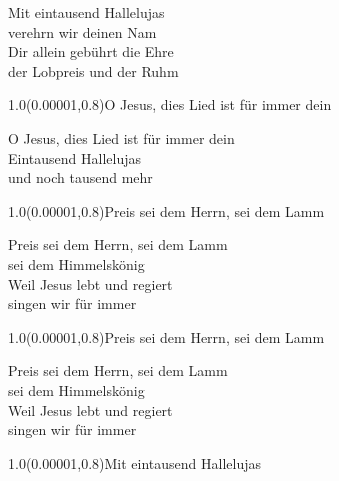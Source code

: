 \documentclass[aspectratio=169]{beamer}
\begin{document}
\begin{frame}
\centering
\color{white}
\huge{Mit eintausend Hallelujas} \\
\huge{verehrn wir deinen Nam} \\
\huge{Dir allein gebührt die Ehre} \\
\huge{der Lobpreis und der Ruhm} \\

\begin{textblock}{1.0}(0.00001,0.8)\color{gray}\normalsize{O Jesus, dies Lied ist für immer dein}\end{textblock}
\end{frame}

\begin{frame}
\centering
\color{white}
\huge{O Jesus, dies Lied ist für immer dein} \\
\huge{Eintausend Hallelujas} \\
\huge{und noch tausend mehr} \\

\begin{textblock}{1.0}(0.00001,0.8)\color{gray}\normalsize{Preis sei dem Herrn, sei dem Lamm}\end{textblock}
\end{frame}

\begin{frame}
\centering
\color{white}
\huge{Preis sei dem Herrn, sei dem Lamm} \\
\huge{sei dem Himmelskönig} \\
\huge{Weil Jesus lebt und regiert} \\
\huge{singen wir für immer} \\

\begin{textblock}{1.0}(0.00001,0.8)\color{gray}\normalsize{Preis sei dem Herrn, sei dem Lamm}\end{textblock}
\end{frame}

\begin{frame}
\centering
\color{white}
\huge{Preis sei dem Herrn, sei dem Lamm} \\
\huge{sei dem Himmelskönig} \\
\huge{Weil Jesus lebt und regiert} \\
\huge{singen wir für immer} \\

\begin{textblock}{1.0}(0.00001,0.8)\color{gray}\normalsize{Mit eintausend Hallelujas}\end{textblock}
\end{frame}
\end{document}
